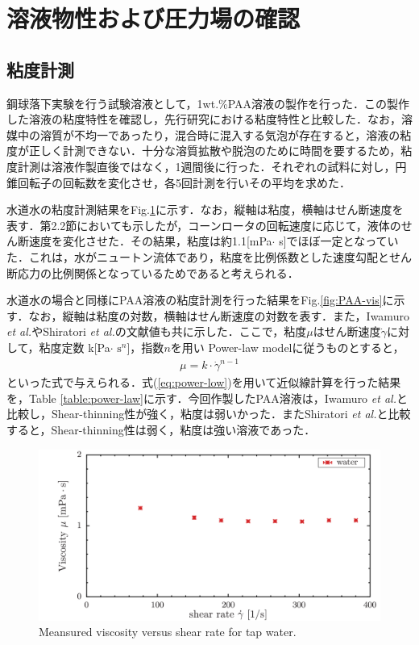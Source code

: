 \section{溶液物性および圧力場の確認}
\subsection{粘度計測}
鋼球落下実験を行う試験溶液として，1wt.\%PAA溶液の製作を行った．この製作した溶液の粘度特性を確認し，先行研究\cite{ref:9}\cite{ref:10}における粘度特性と比較した．なお，溶媒中の溶質が不均一であったり，混合時に混入する気泡が存在すると，溶液の粘度が正しく計測できない．十分な溶質拡散や脱泡のために時間を要するため，粘度計測は溶液作製直後ではなく，1週間後に行った．それぞれの試料に対し，円錐回転子の回転数を変化させ，各5回計測を行いその平均を求めた．

水道水の粘度計測結果をFig.\ref{fig:water-vis}に示す．なお，縦軸は粘度，横軸はせん断速度を表す．第2.2節においても示したが，コーンロータの回転速度に応じて，液体のせん断速度を変化させた．その結果，粘度は約1.1[mPa$\cdot$ s]でほぼ一定となっていた．これは，水がニュートン流体であり，粘度を比例係数とした速度勾配とせん断応力の比例関係となっているためであると考えられる．

水道水の場合と同様にPAA溶液の粘度計測を行った結果をFig.\ref{fig:PAA-vis}に示す．なお，縦軸は粘度の対数，横軸はせん断速度の対数を表す．また，Iwamuro {\it et al.}\cite{ref:9}やShiratori {\it et al.}\cite{ref:10}の文献値も共に示した．ここで，粘度$\mu$はせん断速度$\dot{\gamma}$に対して，粘度定数 k[Pa$\cdot$ $\text{s}^n$]，指数$n$を用い Power-law modelに従うものとすると，
\begin{eqnarray}
    \label{eq:power-low}
    \mu=k\cdot\dot{\gamma}^{n-1}
\end{eqnarray}
といった式で与えられる\cite{ref:1}．式(\ref{eq:power-low})を用いて近似線計算を行った結果を，Table \ref{table:power-law}に示す．今回作製したPAA溶液は，Iwamuro {\it et al.}と比較し，Shear-thinning性が強く，粘度は弱いかった．またShiratori {\it et al.}と比較すると，Shear-thinning性は弱く，粘度は強い溶液であった．

\begin{figure}[ht]
    \centering
    \includegraphics[width=12cm,clip]{4-Results/water.png}
    \caption{Meansured viscosity versus shear rate for tap water.}
    \label{fig:water-vis}
\end{figure}

